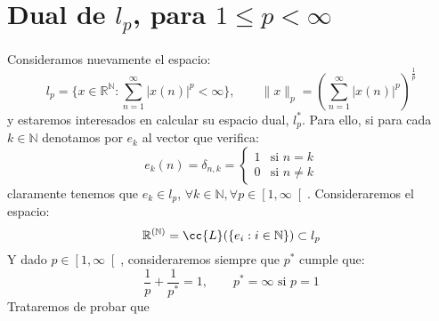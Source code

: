 \section{Dual de $l_p$, para $1\leq p < \infty$}\label{sec:duallp}
\noindent
Consideramos nuevamente el espacio:
\begin{equation*}
    l_p = \{x\in \mathbb{R}^\mathbb{N} : \sum_{n=1}^{\infty}{|x(n)|}^{p}<\infty\}, \qquad \|x\|_p = {\left(\sum_{n=1}^{\infty}{|x(n)|}^{p}\right)}^{\frac{1}{p}}
\end{equation*}
y estaremos interesados en calcular su espacio dual, $l_p^\ast$. Para ello, si para cada $k\in \mathbb{N}$ denotamos por $e_k$ al vector que verifica:
\begin{equation*}
    e_k(n) = \delta_{n,k} = \left\{\begin{array}{ll}
        1 & \text{si\ } n=k \\
        0 & \text{si\ } n\neq k
    \end{array}\right. 
\end{equation*}
claramente tenemos que $e_k\in l_p$, $\forall k\in \mathbb{N}, \forall p\in \left[1,\infty\right[$. Consideraremos el espacio:
\begin{equation*}
    \mathbb{R}^{(\mathbb{N})} = \cc{L}(\{e_i : i \in \mathbb{N}\})\subset l_p
\end{equation*}
Y dado $p\in \left[1,\infty\right[$, consideraremos siempre que $p^\ast$ cumple que:
\begin{equation*}
    \dfrac{1}{p} + \dfrac{1}{p^\ast} = 1, \qquad p^\ast = \infty \text{\ si\ } p = 1
\end{equation*}
Trataremos de probar que 

